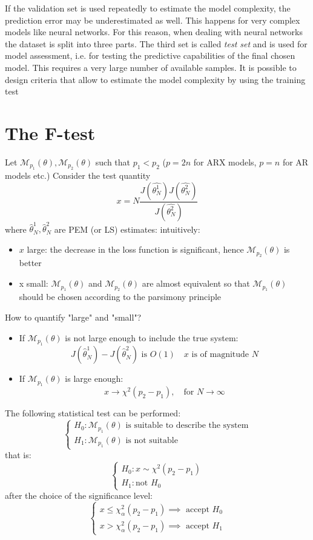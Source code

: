 \documentclass{book}
\theoremstyle{definition}
\theoremstyle{remark}
\theoremstyle{remark}
\begin{document}
If the validation set is used repeatedly to estimate the model complexity, the prediction error may be underestimated as well. This happens for very complex models like neural networks. For this reason, when dealing with neural networks the dataset is split into three parts. The third set is called \emph{test set} and is used for model assessment, i.e. for testing the predictive capabilities of the final chosen model. This requires a very large number of available samples. It is possible to design criteria that allow to estimate the model complexity by using the training test

\section{The F-test}
Let $\mathcal{M}_{p_1}(\theta),\mathcal{M}_{p_2}(\theta)$ such that $p_1<p_2$ ($p=2n$ for ARX models, $p=n$ for AR models etc.) Consider the test quantity
\[
    x=N\displaystyle\frac{J(\hat{\theta^1_N})J(\hat{\theta^2_N})}{J(\hat{\theta^2_N})}
\]
where $\hat{\theta}^1_N,\hat{\theta}^2_N$ are PEM (or LS) estimates: intuitively:
\begin{itemize}
    \item $x$ large: the decrease in the loss function is significant, hence $\mathcal{M}_{p_2}(\theta)$ is better
    \item x small: $\mathcal{M}_{p_1}(\theta)$ and $\mathcal{M}_{p_2}(\theta)$ are almost equivalent so that $\mathcal{M}_{p_1}(\theta)$ should be chosen according to the parsimony principle
\end{itemize}
How to quantify "large" and "small"?
\begin{itemize}
    \item If $\mathcal{M}_{p_1}(\theta)$ is not large enough to include the true system: \[
            J(\hat{\theta}_N^1)-J(\hat{\theta}_N^2) \text{ is } O(1) \quad x\text{ is of magnitude } N
    \]
    \item If $\mathcal{M}_{p_1}(\theta)$ is large enough: \[
            x \to \chi^2(p_2-p_1), \quad \text{for } N\to\infty
    \]
\end{itemize}
The following statistical test can be performed:
\[
    \begin{cases}
        H_0:\mathcal{M}_{p_1}(\theta) \text{ is suitable to describe the system}\\
        H_1:\mathcal{M}_{p_1}(\theta) \text{ is not suitable }
    \end{cases}
\]
that is:
\[
    \begin{cases}
        H_0: x \sim \chi^2(p_2-p_1)\\
        H_1: \text{not }H_0
    \end{cases}
\]
after the choice of the significance level:
\[
    \begin{cases}
        x\leq \chi^2_\alpha(p_2-p_1) \implies \text{ accept }H_0\\
        x>\chi^2_\alpha(p_2-p_1) \implies \text{ accept }H_1
    \end{cases}
\]
\end{document}
